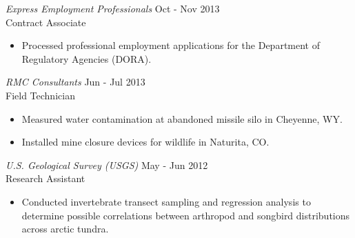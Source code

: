 \documentclass{/Users/alexemrie/Documents/LaTeX/res/res}
\begin{document}
\begin{resume}
{\sl Express Employment Professionals} \hfill    Oct - Nov 2013\\
Contract Associate 

 \begin{itemize} \itemsep -2pt
  \item  Processed professional employment applications for the Department of Regulatory Agencies (DORA).
\end{itemize} \vspace{-6pt}

{\sl RMC Consultants} \hfill    Jun - Jul 2013\\
Field Technician

 \begin{itemize} \itemsep -2pt
  \item  Measured water contamination at abandoned missile silo in Cheyenne, WY.
  \item  Installed mine closure devices for wildlife in Naturita, CO.
\end{itemize} \vspace{-6pt}
  
{\sl U.S. Geological Survey (USGS)} \hfill  May - Jun 2012 \\
Research Assistant
  \begin{itemize}
  \item  Conducted invertebrate transect sampling and regression analysis to determine possible correlations between arthropod and songbird distributions across arctic tundra.
 \end{itemize}

\vspace{0.2in} 

\raggedright
\begin{parcolumns}{2}

\colplacechunks
{}
\end{parcolumns}


\end{resume}
\end{document}

